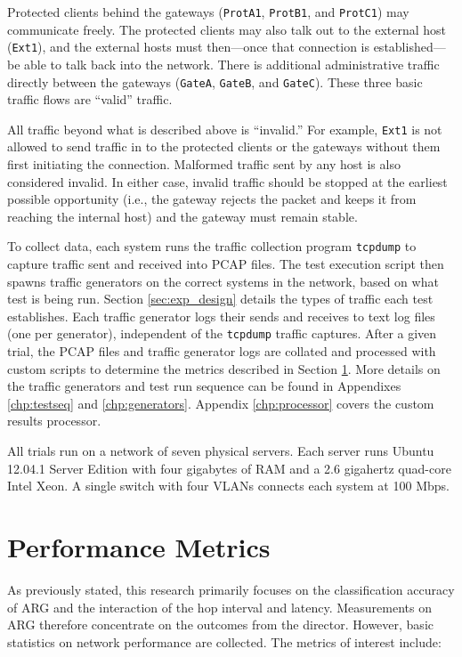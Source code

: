 \par Protected clients behind the gateways (\texttt{ProtA1}, \texttt{ProtB1}, and \texttt{ProtC1}) may communicate freely. The protected clients may also talk out to the external host (\texttt{Ext1}), and the external hosts must then---once that connection is established---be able to talk back into the network. There is additional administrative traffic directly between the gateways (\texttt{GateA}, \texttt{GateB}, and \texttt{GateC}). These three basic traffic flows are ``valid'' traffic.

\par All traffic beyond what is described above is ``invalid.'' For example, \texttt{Ext1} is not allowed to send traffic in to the protected clients or the gateways without them first initiating the connection. Malformed traffic sent by any host is also considered invalid. In either case, invalid traffic should be stopped at the earliest possible opportunity (i.e., the gateway rejects the packet and keeps it from reaching the internal host) and the gateway must remain stable.

\par To collect data, each system runs the traffic collection program \texttt{tcpdump} to capture traffic sent and received into \ac{PCAP} files. The test execution script then spawns traffic generators on the correct systems in the network, based on what test is being run. Section \ref{sec:exp_design} details the types of traffic each test establishes. Each traffic generator logs their sends and receives to text log files (one per generator), independent of the \texttt{tcpdump} traffic captures. After a given trial, the \ac{PCAP} files and traffic generator logs are collated and processed with custom scripts to determine the metrics described in Section \ref{sec:metrics}. More details on the traffic generators and test run sequence can be found in Appendixes \ref{chp:testseq} and \ref{chp:generators}. Appendix \ref{chp:processor} covers the custom results processor.

\par All trials run on a network of seven physical servers. Each server runs Ubuntu 12.04.1 Server Edition with four gigabytes of \ac{RAM} and a 2.6 gigahertz quad-core Intel Xeon. A single switch with four \acp{VLAN} connects each system at 100 \ac{Mbps}.

\section{Performance Metrics}
\label{sec:metrics}
\par As previously stated, this research primarily focuses on the classification accuracy of \ac{ARG} and the interaction of the hop interval and latency. Measurements on \ac{ARG} therefore concentrate on the outcomes from the director. However, basic statistics on network performance are collected. The metrics of interest include:

